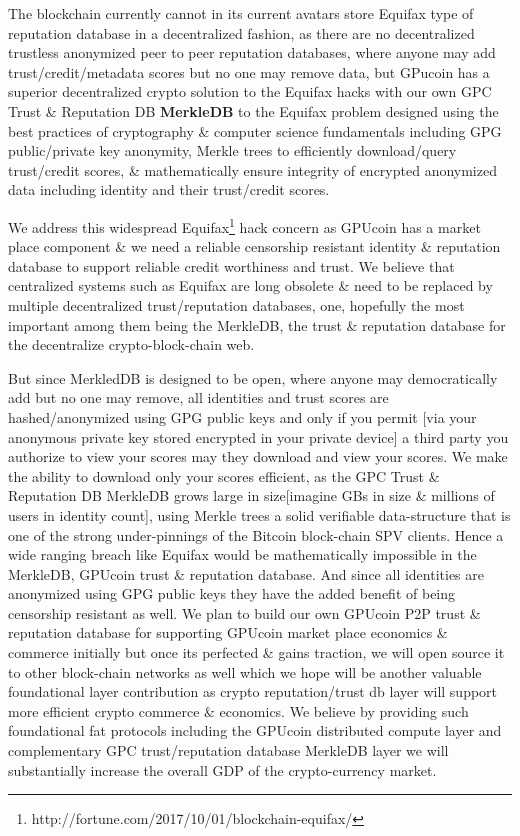 The blockchain currently cannot in its current avatars store Equifax type of reputation database in a decentralized fashion, as there are no decentralized trustless anonymized peer to peer reputation databases, where anyone may add trust/credit/metadata scores but no one may remove data, but GPucoin has a superior decentralized crypto solution to the Equifax hacks with our own GPC Trust \& Reputation DB \textbf{MerkleDB} to the Equifax problem designed using the best practices of cryptography \& computer science fundamentals including GPG public/private key anonymity, Merkle trees to efficiently download/query trust/credit scores, \& mathematically ensure integrity of encrypted anonymized data including identity and their trust/credit scores.

We address this widespread Equifax\footnote{http://fortune.com/2017/10/01/blockchain-equifax/} hack concern as GPUcoin has a market place component \& we need a reliable censorship resistant identity \& reputation database to support reliable credit worthiness and trust. We believe that centralized systems such as Equifax are long obsolete \& need to be replaced by multiple decentralized trust/reputation databases, one, hopefully the most important among them being the MerkleDB, the trust \& reputation database for the decentralize crypto-block-chain web. 

But since MerkledDB is designed to be open, where anyone may democratically add but no one may remove, all identities and trust scores are hashed/anonymized using GPG public keys and only if you permit [via your anonymous private key stored encrypted in your private device] a third party you authorize to view your scores may they download and view your scores. We make the ability to download only your scores efficient, as the GPC Trust \& Reputation DB MerkleDB grows large in size[imagine GBs in size \& millions of users in identity count], using Merkle trees a solid verifiable data-structure that is one of the strong under-pinnings of the Bitcoin block-chain SPV clients. Hence a wide ranging breach like Equifax would be mathematically impossible in the MerkleDB, GPUcoin trust \& reputation database.
And since all identities are anonymized using GPG public keys they have the added benefit of being censorship resistant as well. We plan to build our own GPUcoin P2P trust \& reputation database for supporting GPUcoin market place economics \& commerce initially but once its perfected \& gains traction, we will open source it to other block-chain networks as well which we hope will be another valuable foundational layer contribution as crypto reputation/trust db layer will support more efficient crypto commerce \& economics. We believe by providing such foundational fat protocols including the GPUcoin distributed compute layer and complementary GPC trust/reputation database MerkleDB layer we will substantially increase the overall GDP of the crypto-currency market.